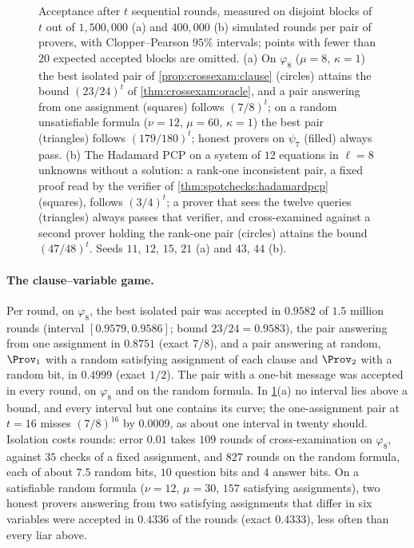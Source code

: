 \begin{refsection}
\begin{figure}[t]
\caption{Acceptance after $t$ sequential rounds, measured on disjoint blocks of $t$ out of $1{,}500{,}000$ (a) and $400{,}000$ (b) simulated rounds per pair of provers, with Clopper--Pearson $95\%$ intervals; points with fewer than $20$ expected accepted blocks are omitted. (a) On $\varphi_8$ ($\mu=8$, $\kappa=1$) the best isolated pair of \cref{prop:crossexam:clause} (circles) attains the bound $(23/24)^t$ of \cref{thm:crossexam:oracle}, and a pair answering from one assignment (squares) follows $(7/8)^t$; on a random unsatisfiable formula ($\nu=12$, $\mu=60$, $\kappa=1$) the best pair (triangles) follows $(179/180)^t$; honest provers on $\psi_7$ (filled) always pass. (b) The Hadamard PCP on a system of $12$ equations in $\ell=8$ unknowns without a solution: a rank-one inconsistent pair, a fixed proof read by the verifier of \cref{thm:spotchecks:hadamardpcp} (squares), follows $(3/4)^t$; a prover that sees the twelve queries (triangles) always passes that verifier, and cross-examined against a second prover holding the rank-one pair (circles) attains the bound $(47/48)^t$. Seeds $11$, $12$, $15$, $21$ (a) and $43$, $44$ (b).}
\label{fig:crossexam:rounds}
\end{figure}

\paragraph{The clause--variable game.} Per round, on $\varphi_8$, the best isolated pair was accepted in $0.9582$ of $1.5$ million rounds (interval $[0.9579,0.9586]$; bound $23/24=0.9583$), the pair answering from one assignment in $0.8751$ (exact $7/8$), and a pair answering at random, $\Prov_1$ with a random satisfying assignment of each clause and $\Prov_2$ with a random bit, in $0.4999$ (exact $1/2$). The pair with a one-bit message was accepted in every round, on $\varphi_8$ and on the random formula. In \cref{fig:crossexam:rounds}(a) no interval lies above a bound, and every interval but one contains its curve; the one-assignment pair at $t=16$ misses $(7/8)^{16}$ by $0.0009$, as about one interval in twenty should. Isolation costs rounds: error $0.01$ takes $109$ rounds of cross-examination on $\varphi_8$, against $35$ checks of a fixed assignment, and $827$ rounds on the random formula, each of about $7.5$ random bits, $10$ question bits and $4$ answer bits. On a satisfiable random formula ($\nu=12$, $\mu=30$, $157$ satisfying assignments), two honest provers answering from two satisfying assignments that differ in six variables were accepted in $0.4336$ of the rounds (exact $0.4333$), less often than every liar above.


\end{refsection}
